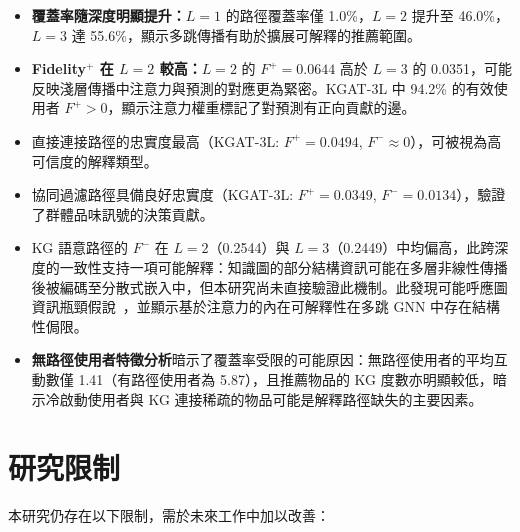 \begin{itemize}[leftmargin=2em]
  \item \textbf{覆蓋率隨深度明顯提升：}$L{=}1$ 的路徑覆蓋率僅 1.0\%，$L{=}2$ 提升至 46.0\%，$L{=}3$ 達 55.6\%，顯示多跳傳播有助於擴展可解釋的推薦範圍。
  \item \textbf{Fidelity$^+$ 在 $L{=}2$ 較高：}$L{=}2$ 的 $F^+ = 0.0644$ 高於 $L{=}3$ 的 0.0351，可能反映淺層傳播中注意力與預測的對應更為緊密。KGAT-3L 中 94.2\% 的有效使用者 $F^+ > 0$，顯示注意力權重標記了對預測有正向貢獻的邊。
  \item 直接連接路徑的忠實度最高（KGAT-3L: $F^+ = 0.0494$, $F^- \approx 0$），可被視為高可信度的解釋類型。
  \item 協同過濾路徑具備良好忠實度（KGAT-3L: $F^+ = 0.0349$, $F^- = 0.0134$），驗證了群體品味訊號的決策貢獻。
  \item KG 語意路徑的 $F^-$ 在 $L{=}2$（0.2544）與 $L{=}3$（0.2449）中均偏高，此跨深度的一致性支持一項可能解釋：知識圖的部分結構資訊可能在多層非線性傳播後被編碼至分散式嵌入中，但本研究尚未直接驗證此機制。此發現可能呼應圖資訊瓶頸假說~\cite{wu2020gib}，並顯示基於注意力的內在可解釋性在多跳 GNN 中存在結構性侷限。
  \item \textbf{無路徑使用者特徵分析}暗示了覆蓋率受限的可能原因：無路徑使用者的平均互動數僅 1.41（有路徑使用者為 5.87），且推薦物品的 KG 度數亦明顯較低，暗示冷啟動使用者與 KG 連接稀疏的物品可能是解釋路徑缺失的主要因素。
\end{itemize}

\section{研究限制}

本研究仍存在以下限制，需於未來工作中加以改善：

